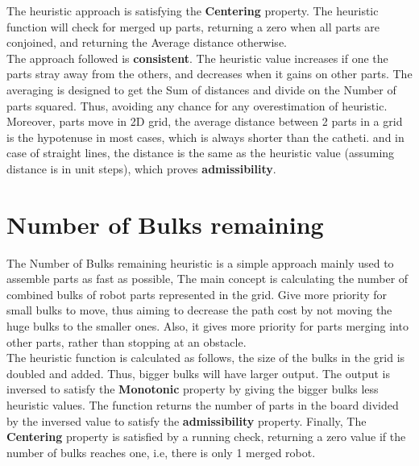 The heuristic approach is satisfying the \textbf{Centering} property. The heuristic function will check for merged up parts, returning a zero when all parts are conjoined, and returning the Average distance otherwise. \\

The approach followed is \textbf{consistent}. The heuristic value increases if one the parts stray away from the others, and decreases when it gains on other parts. The averaging is designed to get the Sum of distances and divide on the Number of parts squared. Thus, avoiding any chance for any overestimation of heuristic. Moreover, parts move in 2D grid, the average distance between 2 parts in a grid is the hypotenuse in most cases, which is always shorter than the catheti. and in case of straight lines, the distance is the same as the heuristic value (assuming distance is in unit steps), which proves \textbf{admissibility}.	


\section{Number of Bulks remaining}

The Number of Bulks remaining heuristic is a simple approach mainly used to assemble parts as fast as possible, The main concept is calculating the number of combined bulks of robot parts represented in the grid. Give more priority for small bulks to move, thus aiming to decrease the path cost by not moving the huge bulks to the smaller ones. Also, it gives more priority for parts merging into other parts, rather than stopping at an obstacle.  \\

The heuristic function is calculated as follows, the size of the bulks in the grid is doubled and added. Thus, bigger bulks will have larger output. The output is inversed to satisfy the \textbf{Monotonic} property by giving the bigger bulks less heuristic values. The function returns the number of parts in the board divided by the inversed value to satisfy the \textbf{admissibility} property. Finally, The \textbf{Centering} property is satisfied by a running check, returning a zero value if the number of bulks reaches one, i.e, there is only 1 merged robot. 
